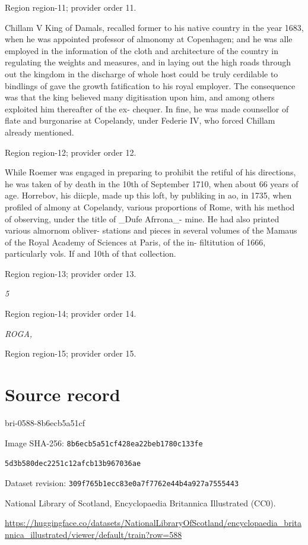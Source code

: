 \documentclass[11pt]{article}
\begin{document}
{\scriptsize\color{gray} Region region-11; provider order 11.\par}
\medskip

Chillam V King of Damals, recalled former to his native country in the year 1683, when he was appointed professor of almonomy at Copenhagen; and he was alle employed in the information of the cloth and architecture of the country in regulating the weights and measures, and in laying out the high roads through out the kingdom in the discharge of whole host could be truly cerdilable to bindlings of gave the growth fatification to his royal employer. The consequence was that the king believed many digitisation upon him, and among others exploited him thereafter of the ex- chequer. In fine, he was made counsellor of flate and burgonarise at Copelandy, under Federie IV, who forced Chillam already mentioned.
\par

{\scriptsize\color{gray} Region region-12; provider order 12.\par}
\medskip

While Roemer was engaged in preparing to prohibit the retiful of his directions, he was taken of by death in the 10th of September 1710, when about 66 years of age. Horrebov, his diicple, made up this loft, by publiking in ao, in 1735, when profiled of almony at Copelandy, various proportions of Rome, with his method of observing, under the title of \_Dufe Afrrona\_- mine. He had also printed various almornom obliver- stations and pieces in several volumes of the Mamaus of the Royal Academy of Sciences at Paris, of the in- filtitution of 1666, particularly vols. If and 10th of that collection.
\par

{\scriptsize\color{gray} Region region-13; provider order 13.\par}
\medskip

{\small\itshape 5\par}

{\scriptsize\color{gray} Region region-14; provider order 14.\par}
\medskip

{\small\itshape ROGA,\par}

{\scriptsize\color{gray} Region region-15; provider order 15.\par}
\medskip
\newpage\section*{Source record}
bri-0588-8b6ecb5a51cf\par
Image SHA-256: \texttt{8b6ecb5a51cf428ea22beb1780c133fe}\par\texttt{5d3b580dec2251c12afcb13b967036ae}\par
Dataset revision: \texttt{309f765b1ecc83e0a7f7}\texttt{762e44b4a927a7555443}\par
National Library of Scotland, Encyclopaedia Britannica Illustrated (CC0).\par
\url{https://huggingface.co/datasets/NationalLibraryOfScotland/encyclopaedia_britannica_illustrated/viewer/default/train?row=588}
\end{document}
